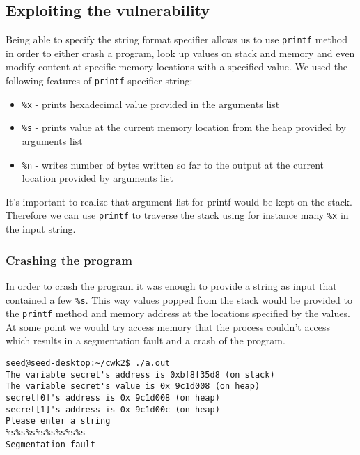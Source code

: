 \documentclass[12pt, a4paper, pdflatex]{article}
\begin{document}
\subsection{Exploiting the vulnerability}
Being able to specify the string format specifier allows us to use \texttt{printf} method in order to either crash a program, look up values on stack and memory and even modify content at specific memory locations with a specified value. We used the following features of \texttt{printf} specifier string:
\begin{itemize}
	\item \texttt{\%x} - prints hexadecimal value provided in the arguments list
	\item \texttt{\%s} - prints value at the current memory location from the heap provided by arguments list
	\item \texttt{\%n} - writes number of bytes written so far to the output at the current location provided by arguments list
\end{itemize}
It's important to realize that argument list for printf would be kept on the stack. Therefore we can use \texttt{printf} to traverse the stack using for instance many \texttt{\%x} in the input string.

\subsubsection{Crashing the program}
In order to crash the program it was enough to provide a string as input that contained a few \texttt{\%s}. This way values popped from the stack would be provided to the \texttt{printf} method and memory address at the locations specified by the values. At some point we would try access memory that the process couldn't access which results in a segmentation fault and a crash of the program.

\vspace{1em}
\lstset{
	captionpos=b,
	frame=single,
	language=BASH,
	caption=Example of crashing the program,
	label=printf:crash
}
\begin{lstlisting}
seed@seed-desktop:~/cwk2$ ./a.out 
The variable secret's address is 0xbf8f35d8 (on stack)
The variable secret's value is 0x 9c1d008 (on heap)
secret[0]'s address is 0x 9c1d008 (on heap)
secret[1]'s address is 0x 9c1d00c (on heap)
Please enter a string
%s%s%s%s%s%s%s%s
Segmentation fault
\end{lstlisting}
\end{document}
